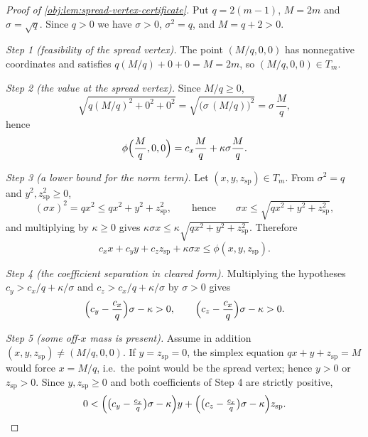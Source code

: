 \begin{proof}[Proof of \cref{obj:lem:spread-vertex-certificate}]
Put \(q=2(m-1)\), \(M=2m\) and \(\sigma=\sqrt q\).  Since \(q>0\) we have \(\sigma>0\), \(\sigma^2=q\), and \(M=q+2>0\).

\emph{Step 1 (feasibility of the spread vertex).}  The point \((M/q,0,0)\) has nonnegative coordinates and satisfies \(q(M/q)+0+0=M=2m\), so \((M/q,0,0)\in T_m\). %

\emph{Step 2 (the value at the spread vertex).}  Since \(M/q\ge0\),
\[
\sqrt{q(M/q)^2+0^2+0^2}=\sqrt{\bigl(\sigma\,(M/q)\bigr)^2}=\sigma\,\frac{M}{q},
\]
hence
\[
\phi\Bigl(\frac Mq,0,0\Bigr)=c_x\frac Mq+\kappa\sigma\frac Mq .
\]

\emph{Step 3 (a lower bound for the norm term).}  Let \((x,y,z_{\mathrm{sp}})\in T_m\).  From \(\sigma^2=q\) and \(y^2,z_{\mathrm{sp}}^2\ge0\),
\[
(\sigma x)^2=qx^2\le qx^2+y^2+z_{\mathrm{sp}}^2,
\qquad\text{hence}\qquad
\sigma x\le\sqrt{qx^2+y^2+z_{\mathrm{sp}}^2},
\]
and multiplying by \(\kappa\ge0\) gives \(\kappa\sigma x\le\kappa\sqrt{qx^2+y^2+z_{\mathrm{sp}}^2}\).  Therefore
\[
c_xx+c_yy+c_zz_{\mathrm{sp}}+\kappa\sigma x\le\phi(x,y,z_{\mathrm{sp}}).
\]

\emph{Step 4 (the coefficient separation in cleared form).}  Multiplying the hypotheses \(c_y>c_x/q+\kappa/\sigma\) and \(c_z>c_x/q+\kappa/\sigma\) by \(\sigma>0\) gives
\[
\Bigl(c_y-\frac{c_x}{q}\Bigr)\sigma-\kappa>0,
\qquad
\Bigl(c_z-\frac{c_x}{q}\Bigr)\sigma-\kappa>0 .
\]

\emph{Step 5 (some off-\(x\) mass is present).}  Assume in addition \((x,y,z_{\mathrm{sp}})\ne(M/q,0,0)\).  If \(y=z_{\mathrm{sp}}=0\), the simplex equation \(qx+y+z_{\mathrm{sp}}=M\) would force \(x=M/q\), i.e.\ the point would be the spread vertex; hence \(y>0\) or \(z_{\mathrm{sp}}>0\).  Since \(y,z_{\mathrm{sp}}\ge0\) and both coefficients of Step 4 are strictly positive,
\[
0<\Bigl(\bigl(c_y-\tfrac{c_x}{q}\bigr)\sigma-\kappa\Bigr)y
+\Bigl(\bigl(c_z-\tfrac{c_x}{q}\bigr)\sigma-\kappa\Bigr)z_{\mathrm{sp}} .
\]


\end{proof}
